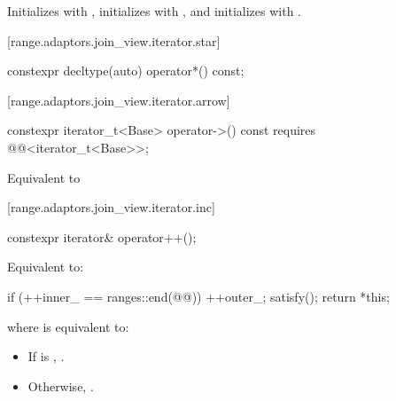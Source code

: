 \begin{itemdescr}
\pnum
\effects Initializes  with , initializes
 with , and initializes  with
.
\end{itemdescr}

[range.adaptors.join_view.iterator.star]{}

\begin{itemdecl}
constexpr decltype(auto) operator*() const;
\end{itemdecl}

\begin{itemdescr}
\pnum
\oldtxt{\returns} 
\end{itemdescr}

{\color{newclr}
[range.adaptors.join_view.iterator.arrow]{}

\begin{itemdecl}
constexpr iterator_t<Base> operator->() const
  requires @@<iterator_t<Base>>;
\end{itemdecl}

\begin{itemdescr}
\pnum
\effects Equivalent to 
\end{itemdescr}
} %

[range.adaptors.join_view.iterator.inc]{}

\begin{itemdecl}
constexpr iterator& operator++();
\end{itemdecl}

\begin{itemdescr}
\pnum
\effects Equivalent to:
\begin{codeblock}
if (++inner_ == ranges::end(@@)) {
  ++outer_;
  satisfy();
}
return *this;
\end{codeblock}

where  is equivalent to:
\begin{itemize}
\item If  is , .
\item Otherwise, .
\end{itemize}
\end{itemdescr}

